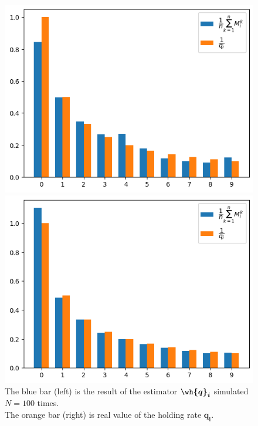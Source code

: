 \begin{figure}[H]
    \centering
    \begin{minipage}[b]{0.49\textwidth}
        \centering
        \includegraphics[width=\textwidth]{../pictures/2.e.3.png}
        \caption*{$N = 100,\; T = 100$}
    \end{minipage}
    \hfill
    \begin{minipage}[b]{0.49\textwidth}
        \centering
        \includegraphics[width=\textwidth]{../pictures/2.e.4.png}
        \caption*{$N = 100,\; T = 1000$}
    \end{minipage}
    \caption*{The {\color{blue} blue bar (left)} is the result of the estimator {\color{blue}$\boldsymbol{\wh{q}_i}$} simulated $N = 100$ times.\\ The {\color{red} orange bar (right)} is real value of the holding rate {\color{red}$\boldsymbol{q_i}$}. }
\end{figure}

